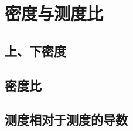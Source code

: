 \section{密度与测度比}
\label{b1:sec:1401}


\subsection{上、下密度}
\label{b1:subsec:140101}

\subsection{密度比}
\label{b1:subsec:140102}

\subsection{测度相对于测度的导数}
\label{b1:subsec:140103}


